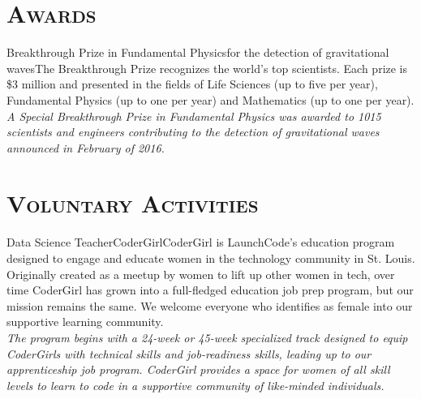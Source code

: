 \documentclass[10pt,a4paper]{moderncv}
\begin{document}
\section{\textsc{Awards}}
 {Breakthrough Prize in Fundamental Physics}{for the detection of gravitational waves}{}{}{The Breakthrough Prize recognizes the world's top scientists. Each prize is \$3 million and presented in the fields of Life Sciences (up to five per year), Fundamental Physics (up to one per year) and Mathematics (up to one per year).\vspace{0.2cm}\\ \textit{A Special Breakthrough Prize in Fundamental Physics was awarded to 1015 scientists and engineers contributing to the detection of gravitational waves announced in February of 2016.}}

\section{\textsc{Voluntary Activities}}
 {Data Science Teacher}{CoderGirl}{}{}{CoderGirl is LaunchCode’s education program designed to engage and educate women in the technology community in St. Louis. Originally created as a meetup by women to lift up other women in tech, over time CoderGirl has grown into a full-fledged education job prep program, but our mission remains the same. We welcome everyone who identifies as female into our supportive learning community.\vspace{0.2cm}\\ \textit{The program begins with a 24-week or 45-week specialized track designed to equip CoderGirls with technical skills and job-readiness skills, leading up to our apprenticeship job program. CoderGirl provides a space for women of all skill levels to learn to code in a supportive community of like-minded individuals.}}
\end{document}
